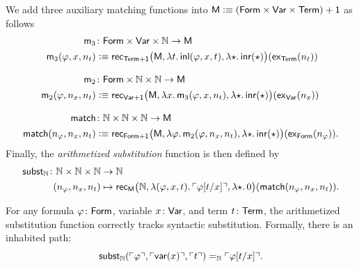 \begin{defns}
    We add three auxiliary matching functions into $\mathsf{M}\mathrel{\vcentcolon}\equiv(\mathsf{Form}\times\mathsf{Var}\times\mathsf{Term})+\mathsf{1}$ as follows
    \begin{align*}
        \fun m_3&\colon\fun{Form}\times\fun{Var}\times\N
            \to\fun M\\
        \fun m_3(\varphi,x,n_t)&\defeq
            \fun{rec}_{\fun{Term}+\fun1}\bigl(
                \fun M,
                \lambda t.\,\fun{inl}(\varphi,x,t),
                \lambda\fstar.\,\fun{inr}(\fstar)
            \bigr)(\fun{ex}_{\fun{Term}}(n_t))\\[3mm]
        \fun m_2&\colon\fun{Form}\times\N\times\N
            \to\fun M\\
        \fun m_2(\varphi,n_x,n_t)&\defeq
            \fun{rec}_{\fun{Var}+\fun1}\bigl(
                \fun M,
                \lambda x.\,\fun{m}_3(\varphi,x,n_t),
                \lambda\fstar.\,\fun{inr}(\fstar)
            \bigr)(\fun{ex}_{\fun{Var}}(n_x))\\[3mm]
        \fun{match}&\colon\N\times\N\times\N
            \to\fun M\\
        \fun{match}(n_\varphi,n_x,n_t)&\defeq
            \fun{rec}_{\fun{Form}+\fun1}\bigl(
                \fun M,
            \lambda\varphi.\,\fun{m}_2(\varphi,n_x,n_t),
            \lambda\fstar.\,\fun{inr}(\fstar)
        \bigr)(\fun{ex}_{\fun{Form}}(n_\varphi)).
    \end{align*}
    Finally, the \textsl{arithmetized substitution} function is then defined by
    \begin{align*}
        \fun{subst}_{\N}\colon\N\times\N\times\N
            &\to\N\\
        (n_\varphi,n_x,n_t)
            &\mapsto\fun{rec}_{\fun M}
            \bigl(
                \N, 
                \lambda(\varphi,x,t).\,\gn{\varphi[t/x]}, 
                \lambda\fstar.\,0
            \bigr)(\fun{match}(n_\varphi,n_x,n_t)).
    \end{align*}
\end{defns}

\begin{lem}\label{lem:subst-gn-soundness}
    For any formula\/ $\varphi\colon\fun{Form}$, variable\/ $x\colon\fun{Var}$, and term\/ $t\colon\fun{Term}$, the arithmetized substitution function correctly tracks syntactic substitution. Formally, there is an inhabited path:
    \[
        \mathsf{subst}_{\mathbb{N}}(
            \ulcorner\varphi\urcorner,
            \ulcorner\mathsf{var}(x)\urcorner,
            \ulcorner t\urcorner
        )
        \mathrel{=_{\mathbb{N}}}\ulcorner\varphi[t/x]\urcorner.
    \]
\end{lem}

